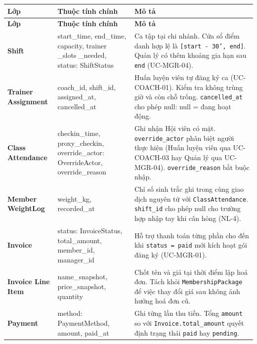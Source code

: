 \begingroup
\renewcommand{\arraystretch}{1.3}
\begin{longtable}{|>{\centering\arraybackslash}m{3.2cm}|>{\ttfamily\raggedright\arraybackslash}m{3.5cm}|>{\raggedright\arraybackslash}m{7.5cm}|}
\hline
\textbf{Lớp} & \normalfont\textbf{Thuộc tính chính} & \textbf{Mô tả} \\ \hline
\endfirsthead
\hline
\textbf{Lớp} & \normalfont\textbf{Thuộc tính chính} & \textbf{Mô tả} \\ \hline
\endhead
\hline
\endfoot

\textbf{Shift} &
  start\_time, end\_time, capacity,
  trainer \_slots \_needed, status: ShiftStatus &
  Ca tập tại chi nhánh. Cửa sổ điểm danh hợp lệ là
  \texttt{[start - 30', end]}. Quản lý có thêm khoảng gia hạn sau
  \texttt{end} (UC-MGR-04). \\ \hline

\textbf{Trainer Assignment} &
  coach\_id, shift\_id, assigned\_at, cancelled\_at &
  Huấn luyện viên tự đăng ký ca (UC-COACH-01). Kiểm tra không trùng
  giờ và còn chỗ trống. \texttt{cancelled\_at} cho phép null:
  null = đang hoạt động. \\ \hline

\textbf{Class Attendance} &
  checkin\_time, proxy\_checkin,
  override\_actor: OverrideActor, override\_reason &
  Ghi nhận Hội viên có mặt. \texttt{override\_actor} phân
  biệt người thực hiện (Huấn luyện viên qua UC-COACH-03 hay Quản lý
  qua UC-MGR-04). \texttt{override\_reason} bắt buộc nhập. \\ \hline

\textbf{Member WeightLog} &
  weight\_kg, recorded\_at &
  Chỉ số sinh trắc ghi trong cùng giao dịch nguyên tử với
  \texttt{ClassAttendance}. \texttt{shift\_id} cho phép null
  cho trường hợp nhập tay khi cân hỏng (NL-4). \\ \hline

\textbf{Invoice} &
  status: InvoiceStatus, total\_amount,
  member\_id, manager\_id &
  Hỗ trợ thanh toán từng phần cho đến khi \texttt{status = paid}
  mới kích hoạt gói đăng ký (UC-MGR-01). \\ \hline

\textbf{Invoice Line Item} &
  name\_snapshot, price\_snapshot, quantity &
  Chốt tên và giá tại thời điểm lập hoá đơn. Tách khỏi
  \texttt{MembershipPackage} để việc thay đổi giá sau không
  ảnh hưởng hoá đơn cũ. \\ \hline

\textbf{Payment} &
  method: PaymentMethod, amount, paid\_at &
  Ghi từng lần thu tiền. Tổng \texttt{amount} so với
  \texttt{Invoice.total\_amount} quyết định trạng
  thái \texttt{paid} hay \texttt{pending}. \\ \hline


\end{longtable}
